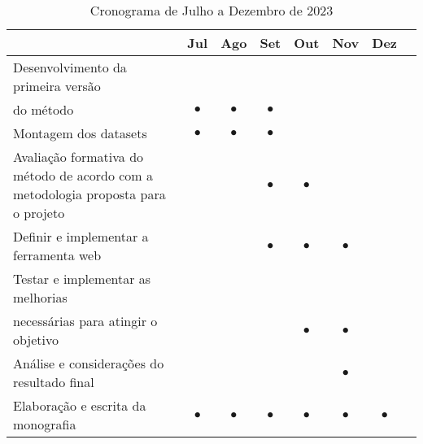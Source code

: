 \begin{table}[ht]
        \centering
        \begin{tabular}{ p{7.8cm} c c c c c c c }
                \toprule
                 & Jul       & Ago       & Set       & Out       & Nov       & Dez       & \\
                \midrule
                Desenvolvimento da primeira versão                                         \\ do método
                 & $\bullet$ & $\bullet$ & $\bullet$ &           &           &           & \\
                \midrule
                Montagem dos datasets
                 & $\bullet$ & $\bullet$ & $\bullet$ &           &           &           & \\
                \midrule
                Avaliação formativa do método de acordo com a metodologia proposta para o projeto
                 &           &           & $\bullet$ & $\bullet$ &           &           & \\
                \midrule
                Definir e implementar a ferramenta web
                 &           &           & $\bullet$ & $\bullet$ & $\bullet$ &           & \\
                \midrule
                Testar e implementar as melhorias                                          \\ necessárias para atingir o objetivo
                 &           &           &           & $\bullet$ & $\bullet$ &           & \\
                \midrule
                Análise e considerações do resultado final
                 &           &           &           &           & $\bullet$ &           & \\
                \midrule
                Elaboração e escrita da monografia
                 & $\bullet$ & $\bullet$ & $\bullet$ & $\bullet$ & $\bullet$ & $\bullet$ & \\
                \midrule
                \bottomrule
        \end{tabular}
        \caption{Cronograma de Julho a Dezembro de 2023}~\label{tab:cronograma_tcc_ii}
\end{table}